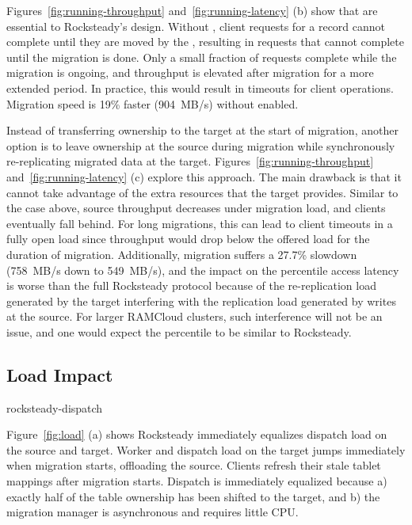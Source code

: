 Figures~\ref{fig:running-throughput} and~\ref{fig:running-latency} (b) show
that \priopulls are essential to Rocksteady's design. Without
\priopulls, client
requests for a record cannot complete until they are moved by the
\pulls, resulting in requests that cannot complete
until the migration is done. Only a small fraction of requests complete
while the migration is ongoing, and throughput is elevated after
migration for a more extended period. In practice, this would result in
timeouts for client operations. Migration speed is 19\% faster
(904~MB/s) without \priopulls enabled.

Instead of transferring ownership to the target at the start of migration,
another option is to leave ownership at the source during migration
while synchronously re-replicating migrated data at the target.
Figures~\ref{fig:running-throughput} and~\ref{fig:running-latency} (c) explore
this approach. The main drawback is that it cannot take advantage of the
extra resources that the target provides. Similar to the
case above, source throughput decreases under migration load, and clients
eventually fall behind.  For long migrations, this can lead to client timeouts
in a fully open load since throughput would drop below the offered load
for the duration of migration.
Additionally, migration suffers a 27.7\% slowdown
(758~MB/s down to 549~MB/s), and the impact on the \nnnth
percentile access latency is worse than the full Rocksteady protocol
because of the re-replication load generated by the target interfering
with the replication load generated by writes at the source. For larger
RAMCloud clusters, such interference will not be an issue, and one would
expect the \nnnth percentile to be similar to Rocksteady.

\subsection{Load Impact}
\label{sec:eval-load}

 {rocksteady-dispatch}

Figure~\ref{fig:load} (a) shows Rocksteady immediately equalizes
dispatch load on the source and target. Worker and dispatch load on the
target jumps immediately when migration starts, offloading the source.
Clients refresh their stale tablet mappings after migration starts.
Dispatch is immediately equalized because
a) exactly half of the table ownership has been shifted to the target, and
b) the migration manager is asynchronous and requires little CPU.

